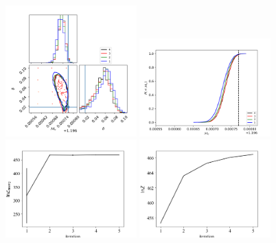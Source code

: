 \documentclass[twocolumn,prd,nofootinbib]{revtex4}
\begin{document}
\begin{figure}
\includegraphics[width=0.45\textwidth]{figures/bns_zerospin_corner_mc_delta_mc.png}
\includegraphics[width=0.45\textwidth]{figures/bns_zerospin_mc_cum.png}
\includegraphics[width=0.45\textwidth]{figures/bns_zerospin_lnL_meanVar.png}
\includegraphics[width=0.45\textwidth]{figures/bns_zerospin_lnL_converge.png}

\end{figure}
\end{document}
